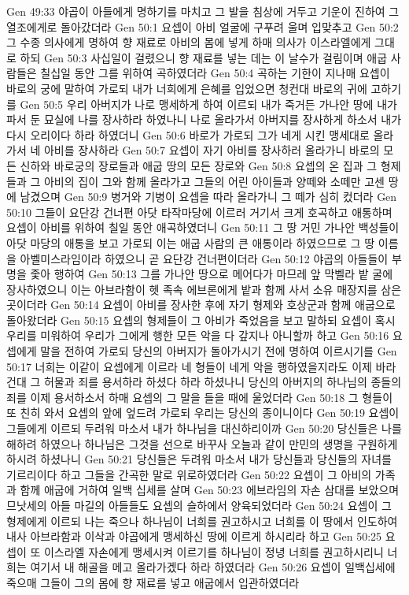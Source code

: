 Gen 49:33  야곱이 아들에게 명하기를 마치고 그 발을 침상에 거두고 기운이 진하여 그 열조에게로 돌아갔더라
Gen 50:1  요셉이 아비 얼굴에 구푸려 울며 입맞추고
Gen 50:2  그 수종 의사에게 명하여 향 재료로 아비의 몸에 넣게 하매 의사가 이스라엘에게 그대로 하되
Gen 50:3  사십일이 걸렸으니 향 재료를 넣는 데는 이 날수가 걸림이며 애굽 사람들은 칠십일 동안 그를 위하여 곡하였더라
Gen 50:4  곡하는 기한이 지나매 요셉이 바로의 궁에 말하여 가로되 내가 너희에게 은혜를 입었으면 청컨대 바로의 귀에 고하기를
Gen 50:5  우리 아버지가 나로 맹세하게 하여 이르되 내가 죽거든 가나안 땅에 내가 파서 둔 묘실에 나를 장사하라 하였나니 나로 올라가서 아버지를 장사하게 하소서 내가 다시 오리이다 하라 하였더니
Gen 50:6  바로가 가로되 그가 네게 시킨 맹세대로 올라가서 네 아비를 장사하라
Gen 50:7  요셉이 자기 아비를 장사하러 올라가니 바로의 모든 신하와 바로궁의 장로들과 애굽 땅의 모든 장로와
Gen 50:8  요셉의 온 집과 그 형제들과 그 아비의 집이 그와 함께 올라가고 그들의 어린 아이들과 양떼와 소떼만 고센 땅에 남겼으며
Gen 50:9  병거와 기병이 요셉을 따라 올라가니 그 떼가 심히 컸더라
Gen 50:10  그들이 요단강 건너편 아닷 타작마당에 이르러 거기서 크게 호곡하고 애통하며 요셉이 아비를 위하여 칠일 동안 애곡하였더니
Gen 50:11  그 땅 거민 가나안 백성들이 아닷 마당의 애통을 보고 가로되 이는 애굽 사람의 큰 애통이라 하였으므로 그 땅 이름을 아벨미스라임이라 하였으니 곧 요단강 건너편이더라
Gen 50:12  야곱의 아들들이 부명을 좇아 행하여
Gen 50:13  그를 가나안 땅으로 메어다가 마므레 앞 막벨라 밭 굴에 장사하였으니 이는 아브라함이 헷 족속 에브론에게 밭과 함께 사서 소유 매장지를 삼은 곳이더라
Gen 50:14  요셉이 아비를 장사한 후에 자기 형제와 호상군과 함께 애굽으로 돌아왔더라
Gen 50:15  요셉의 형제들이 그 아비가 죽었음을 보고 말하되 요셉이 혹시 우리를 미워하여 우리가 그에게 행한 모든 악을 다 갚지나 아니할까 하고
Gen 50:16  요셉에게 말을 전하여 가로되 당신의 아버지가 돌아가시기 전에 명하여 이르시기를
Gen 50:17  너희는 이같이 요셉에게 이르라 네 형들이 네게 악을 행하였을지라도 이제 바라건대 그 허물과 죄를 용서하라 하셨다 하라 하셨나니 당신의 아버지의 하나님의 종들의 죄를 이제 용서하소서 하매 요셉의 그 말을 들을 때에 울었더라
Gen 50:18  그 형들이 또 친히 와서 요셉의 앞에 엎드려 가로되 우리는 당신의 종이니이다
Gen 50:19  요셉이 그들에게 이르되 두려워 마소서 내가 하나님을 대신하리이까
Gen 50:20  당신들은 나를 해하려 하였으나 하나님은 그것을 선으로 바꾸사 오늘과 같이 만민의 생명을 구원하게 하시려 하셨나니
Gen 50:21  당신들은 두려워 마소서 내가 당신들과 당신들의 자녀를 기르리이다 하고 그들을 간곡한 말로 위로하였더라
Gen 50:22  요셉이 그 아비의 가족과 함께 애굽에 거하여 일백 십세를 살며
Gen 50:23  에브라임의 자손 삼대를 보았으며 므낫세의 아들 마길의 아들들도 요셉의 슬하에서 양육되었더라
Gen 50:24  요셉이 그 형제에게 이르되 나는 죽으나 하나님이 너희를 권고하시고 너희를 이 땅에서 인도하여 내사 아브라함과 이삭과 야곱에게 맹세하신 땅에 이르게 하시리라 하고
Gen 50:25  요셉이 또 이스라엘 자손에게 맹세시켜 이르기를 하나님이 정녕 너희를 권고하시리니 너희는 여기서 내 해골을 메고 올라가겠다 하라 하였더라
Gen 50:26  요셉이 일백십세에 죽으매 그들이 그의 몸에 향 재료를 넣고 애굽에서 입관하였더라


